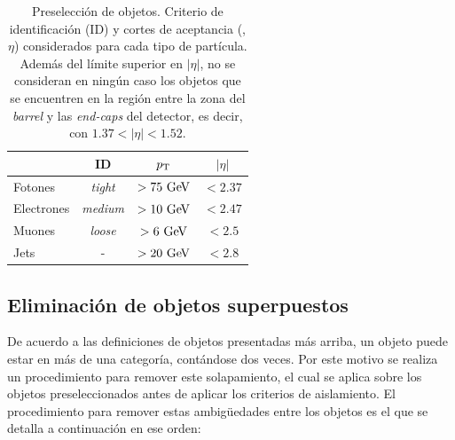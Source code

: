 \begin{table}[!htbp]
  \centering

  \caption{Preselección de objetos. Criterio de identificación (ID) y cortes de
    aceptancia (\pt, $\eta$) considerados para cada tipo de partícula. Además
    del límite superior en $|\eta|$, no se consideran en ningún caso los objetos
    que se encuentren en la región entre la zona del \emph{barrel} y las \emph{end-caps} del detector, es
    decir, con $1.37 < |\eta| < 1.52$.}
  \label{tab:base_sel}

  \begin{tabularx}{0.8\textwidth}{LCCC}
    \hline
    & ID & $p_{\mathrm{T}}$ & $|\eta|$ \\
    \hline
    Fotones    & \emph{tight}  & $> 75 \gev$ & $<2.37$ \\
    Electrones & \emph{medium} & $> 10 \gev$ & $<2.47$ \\
    Muones     & \emph{loose}  & $> 6  \gev$ & $<2.5$  \\
    Jets       & -             & $> 20 \gev$ & $<2.8$  \\
    \hline
  \end{tabularx}

\end{table}





\subsection{Eliminación de objetos superpuestos} %
\label{sec:overlap_romoval_event_veto}

De acuerdo a las definiciones de objetos presentadas más arriba, un objeto puede estar en
más de una categoría, contándose dos veces. Por este motivo se realiza un
procedimiento para remover este solapamiento, el cual se aplica sobre los
objetos preseleccionados antes de aplicar los criterios de aislamiento. El
procedimiento para remover estas ambigüedades entre los objetos es el que se
detalla a continuación en ese orden:

